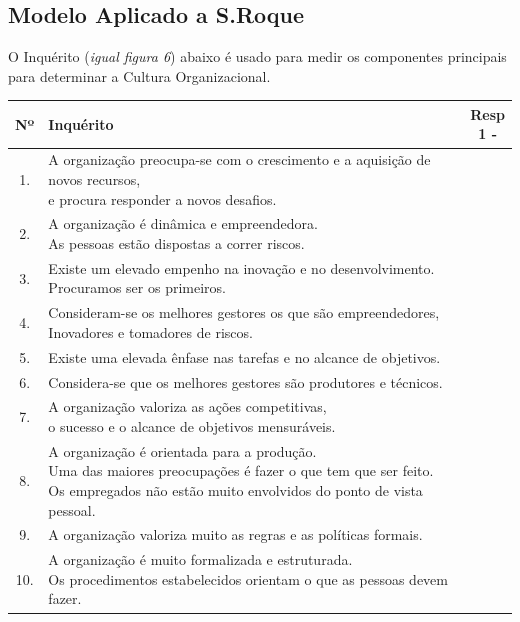 \subsection{Modelo Aplicado a S.Roque}
O Inquérito (\textit{igual figura 6}) abaixo é usado para medir os componentes principais para determinar a Cultura Organizacional.
\begin{table}[H]
\begin{adjustbox}{max width=\textwidth}
\begin{tabular}{ |c|l|c| }
\hline
\rowcolor[gray]{0.5}
Nº & Inquérito & \makecell[l]{Resp \\ 1 \; - \; 7} \\
\hline
1. & \makecell[l]{A organização preocupa-se com o crescimento e a aquisição de novos recursos, \\ e procura responder a novos desafios.} & \\
\hline
2. & \makecell[l]{A organização é dinâmica e empreendedora. \\ As pessoas estão dispostas a correr riscos.} & \\
\hline
3. & \makecell[l]{Existe um elevado empenho na inovação e no desenvolvimento. \\ Procuramos ser os primeiros.} & \\
\hline
4. & \makecell[l]{Consideram-se os melhores gestores os que são empreendedores, \\ Inovadores e tomadores de riscos.} & \\
\hline
5. & Existe uma elevada ênfase nas tarefas e no alcance de objetivos. & \\
\hline
6. & Considera-se que os melhores gestores são produtores e técnicos. & \\
\hline
7. & \makecell[l]{A organização valoriza as ações competitivas, \\ o sucesso e o alcance de objetivos mensuráveis.} & \\
\hline
8. & \makecell[l]{A organização é orientada para a produção. \\ Uma das maiores preocupações é fazer o que tem que ser feito. \\ Os empregados não estão muito envolvidos do ponto de vista pessoal.} & \\
\hline
9. & A organização valoriza muito as regras e as políticas formais. & \\
\hline
10. & \makecell[l]{A organização é muito formalizada e estruturada. \\ Os procedimentos estabelecidos orientam o que as pessoas devem fazer.} & \\

\end{tabular}
\end{adjustbox}
\end{table}
